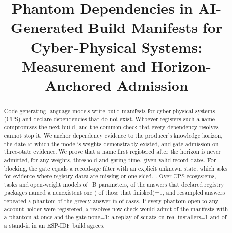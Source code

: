 \documentclass[conference]{IEEEtran}
\newif\ifanon      \anontrue        %
\newif\ifpilot     \pilotfalse      %
\providecommand{\rHasPersist}{0}\providecommand{\rHasFamCmp}{0}\providecommand{\rHasExample}{0}
\providecommand{\rHasReplay}{0}\providecommand{\rHasEspBuild}{0}\providecommand{\rRpNetns}{0}\providecommand{\rValByResponse}{0}\providecommand{\rNoPinBelowTheta}{0}\providecommand{\rHasLock}{0}\providecommand{\rHasAudit}{0}\providecommand{\rHasFamEq}{0}\providecommand{\rMainLock}{0}\providecommand{\rRpLockExec}{0}\providecommand{\rMaxAnsCut}{0}\providecommand{\rReqOnlyUrlPio}{0}\providecommand{\rReqPioSpan}{0}\providecommand{\rHistAfterPThreeUAdmit}{0}\providecommand{\rNGgufIsHorizon}{0}\providecommand{\rRemovedModel}{?}\providecommand{\rRemovedAnswers}{?}\providecommand{\rSqAbsRestOwned}{0}\providecommand{\rSqAbsRest}{0}\providecommand{\rNRemovedModels}{0}\providecommand{\rPostHorizonShiftSame}{0}
\providecommand{\rHasGroups}{0}\providecommand{\rHasHistCost}{0}\providecommand{\rGateEqFilter}{0}
\begin{document}

\title{Phantom Dependencies in AI-Generated Build Manifests for Cyber-Physical Systems: Measurement and Horizon-Anchored Admission}

\ifanon
\author{}
\else

\fi

\maketitle

\ifpilot
\noindent\fcolorbox{red}{red!4}{\parbox{\dimexpr\columnwidth-2\fboxsep-2\fboxrule\relax}{\footnotesize\textbf{Draft.}
All results in this version come from the \emph{pilot} of Table~\ref{tab:models} (\rNModels{} open-weight models
of \rRunMinParams--\rRunMaxParams B parameters on a 2-vCPU host). They validate the harness end to end and are not the
study results; the manual validation of extraction (Section~\ref{sec:extraction}) is still to be done.
Run the study configuration (Section~\ref{sec:models}), set \texttt{\textbackslash pilotfalse} and rebuild before
submission; every number, table and figure regenerates.}}
\fi

\begin{abstract}
Code-generating language models write build manifests for cyber-physical systems (CPS) and declare dependencies
that do not exist. Whoever registers such a name compromises the next build, and the common check that every
dependency resolves cannot stop it. We anchor dependency evidence to the producer's knowledge horizon, the date at
which the model's weights demonstrably existed, and gate admission on three-state evidence. We prove that a name first registered after the horizon is never admitted, for
any weights, threshold and gating time, given valid record dates. For blocking, the gate equals a record-age filter with
an explicit unknown state, which asks for evidence where registry dates are missing or one-sided.
\ifpilot In a pilot over \rNEcos{} CPS ecosystems with \rNTasks{} tasks and \rNModels{} open-weight models,
\rPhantomDecl{} of \rDeclRegistry{} registry declarations did not resolve, and \rPhantomResp{} of the answers that
declared registry packages named a nonexistent one\ifnum\rHasGroups=1{} (\rGrpSmallResp{} for \rGrpSmallN{} models of
\rGrpSmallMinB--\rGrpSmallMaxB B parameters, \rGrpLargeResp{} for \rGrpLargeN{} of \rGrpLargeMinB--\rGrpLargeMaxB
B)\fi.
\else Over \rNEcos{} CPS ecosystems, \rNTasks{} tasks and \rNModels{} open-weight models of
\rRunMinParams--\rRunMaxParams B parameters, \rPhantomResp{} of the answers that declared registry packages named a
nonexistent one (\rPhantomRespNoTrunc{} of those that finished)\ifnum\rHasPersist=1, and resampled answers repeated a
phantom of the greedy answer in \rPersist{} of cases\fi.
\fi If every phantom open to any account holder were registered, a resolves-now check would admit
\rSqOpenExistsZero{} of the manifests with a phantom at once and the gate none\ifnum\rHasReplay=1; a replay of
\rRpSquatsBaseN{} squats on real installers\ifnum\rHasEspBuild=1{} and of a stand-in in an ESP-IDF build\fi{} agrees\fi.
\end{abstract}
\end{document}
